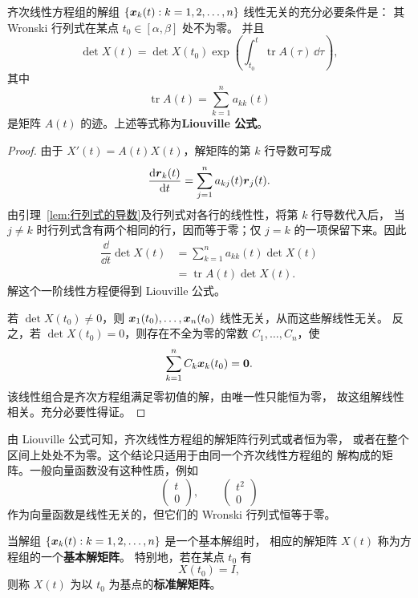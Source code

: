 \begin{theorem}\label{thm:Wronski判别与Liouville公式}
	齐次线性方程组的解组
	$\{\boldsymbol{x}_k(t):k=1,2,\ldots,n\}$ 线性无关的充分必要条件是：
	其 Wronski 行列式在某点 $t_0\in[\alpha,\beta]$ 处不为零。
	并且
	\[
		\det X(t)
		=\det X(t_0)
		\exp\left(
		\int_{t_0}^{t}\operatorname{tr}A(\tau)\,\dd\tau
		\right),
	\]
	其中
	\[
		\operatorname{tr}A(t)=\sum_{k=1}^{n}a_{kk}(t)
	\]
	是矩阵 $A(t)$ 的迹。上述等式称为\textbf{Liouville 公式}。
\end{theorem}

\begin{proof}
	由于 $X'(t)=A(t)X(t)$，解矩阵的第 $k$ 行导数可写成
	\[
		\dfrac{\mathrm{d}\boldsymbol{r}_k(t)}{\mathrm{d} t}
		=\sum_{j=1}^{n}a_{kj}(t)\boldsymbol{r}_j(t).
	\]
	由引理~\ref{lem:行列式的导数}及行列式对各行的线性性，将第 $k$ 行导数代入后，
	当 $j\neq k$ 时行列式含有两个相同的行，因而等于零；仅
	$j=k$ 的一项保留下来。因此
	\[
		\begin{aligned}
		\dfrac{\dd}{\dd t}\det X(t)
		&=\sum_{k=1}^{n}a_{kk}(t)\det X(t)\\
		&=\operatorname{tr}A(t)\det X(t).
		\end{aligned}
	\]
	解这个一阶线性方程便得到 Liouville 公式。

	若 $\det X(t_0)\neq 0$，则
	$\boldsymbol{x}_1(t_0),\ldots,\boldsymbol{x}_n(t_0)$ 线性无关，从而这些解线性无关。
	反之，若 $\det X(t_0)=0$，则存在不全为零的常数
	$C_1,\ldots,C_n$，使
	\[
		\sum_{k=1}^{n}C_k\boldsymbol{x}_k(t_0)=\boldsymbol{0}.
	\]
	该线性组合是齐次方程组满足零初值的解，由唯一性只能恒为零，
	故这组解线性相关。充分必要性得证。
\end{proof}

由 Liouville 公式可知，齐次线性方程组的解矩阵行列式或者恒为零，
或者在整个区间上处处不为零。这个结论只适用于由同一个齐次线性方程组的
解构成的矩阵。一般向量函数没有这种性质，例如
\[
	\begin{pmatrix}
		t\\
		0
	\end{pmatrix},
	\qquad
	\begin{pmatrix}
		t^2\\
		0
	\end{pmatrix}
\]
作为向量函数是线性无关的，但它们的 Wronski 行列式恒等于零。

\begin{definition}\label{def:基本解矩阵与标准解矩阵}
	当解组 $\{\boldsymbol{x}_k(t):k=1,2,\ldots,n\}$ 是一个基本解组时，
	相应的解矩阵 $X(t)$ 称为方程组的一个\textbf{基本解矩阵}。
	特别地，若在某点 $t_0$ 有
	\[
		X(t_0)=I,
	\]
	则称 $X(t)$ 为以 $t_0$ 为基点的\textbf{标准解矩阵}。
\end{definition}

